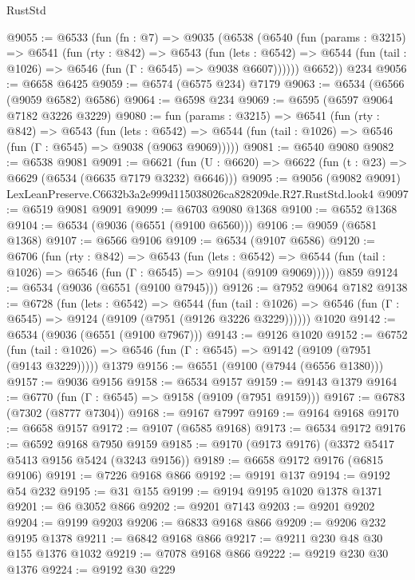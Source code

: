 \begin{lexlean}{RustStd}
\begin{coremodule}
@9055 := @6533
    (fun (fn : @7) =>
    @9035
      (@6538
        (@6540
          (fun (params : @3215) =>
          @6541
            (fun (rty : @842) =>
            @6543
              (fun (lets : @6542) =>
              @6544 (fun (tail : @1026) => @6546 (fun (Γ : @6545) => @9038 @6607))))))
        @6652))
    @234
@9056 := @6658 @6425
@9059 := @6574 (@6575 @234) @7179
@9063 := @6534 (@6566 (@9059 @6582) @6586)
@9064 := @6598 @234
@9069 := @6595 (@6597 @9064 @7182 @3226 @3229)
@9080 := fun (params : @3215) =>
  @6541
    (fun (rty : @842) =>
    @6543
      (fun (lets : @6542) =>
      @6544 (fun (tail : @1026) => @6546 (fun (Γ : @6545) => @9038 (@9063 @9069)))))
@9081 := @6540 @9080
@9082 := @6538 @9081
@9091 := @6621 (fun (U : @6620) => @6622 (fun (t : @23) => @6629 (@6534 (@6635 @7179 @3232) @6646)))
@9095 := @9056 (@9082 @9091) LexLeanPreserve.C6632b3a2e999d115038026ca828209de.R27.RustStd.look4
@9097 := @6519 @9081 @9091
@9099 := @6703 @9080 @1368
@9100 := @6552 @1368
@9104 := @6534 (@9036 (@6551 (@9100 @6560)))
@9106 := @9059 (@6581 @1368)
@9107 := @6566 @9106
@9109 := @6534 (@9107 @6586)
@9120 := @6706
    (fun (rty : @842) =>
    @6543
      (fun (lets : @6542) =>
      @6544 (fun (tail : @1026) => @6546 (fun (Γ : @6545) => @9104 (@9109 @9069)))))
    @859
@9124 := @6534 (@9036 (@6551 (@9100 @7945)))
@9126 := @7952 @9064 @7182
@9138 := @6728
    (fun (lets : @6542) =>
    @6544
      (fun (tail : @1026) => @6546 (fun (Γ : @6545) => @9124 (@9109 (@7951 (@9126 @3226 @3229))))))
    @1020
@9142 := @6534 (@9036 (@6551 (@9100 @7967)))
@9143 := @9126 @1020
@9152 := @6752
    (fun (tail : @1026) => @6546 (fun (Γ : @6545) => @9142 (@9109 (@7951 (@9143 @3229)))))
    @1379
@9156 := @6551 (@9100 (@7944 (@6556 @1380)))
@9157 := @9036 @9156
@9158 := @6534 @9157
@9159 := @9143 @1379
@9164 := @6770 (fun (Γ : @6545) => @9158 (@9109 (@7951 @9159)))
@9167 := @6783 (@7302 (@8777 @7304))
@9168 := @9167 @7997
@9169 := @9164 @9168
@9170 := @6658 @9157
@9172 := @9107 (@6585 @9168)
@9173 := @6534 @9172
@9176 := @6592 @9168 @7950 @9159
@9185 := @9170 (@9173 @9176) (@3372 @5417 @5413 @9156 @5424 (@3243 @9156))
@9189 := @6658 @9172 @9176 (@6815 @9106)
@9191 := @7226 @9168 @866
@9192 := @9191 @137
@9194 := @9192 @54 @232
@9195 := @31 @155
@9199 := @9194 @9195 @1020 @1378 @1371
@9201 := @6 @3052 @866
@9202 := @9201 @7143
@9203 := @9201 @9202
@9204 := @9199 @9203
@9206 := @6833 @9168 @866
@9209 := @9206 @232 @9195 @1378
@9211 := @6842 @9168 @866
@9217 := @9211 @230 @48 @30 @155 @1376 @1032
@9219 := @7078 @9168 @866
@9222 := @9219 @230 @30 @1376
@9224 := @9192 @30 @229

\end{coremodule}
\end{lexlean}
